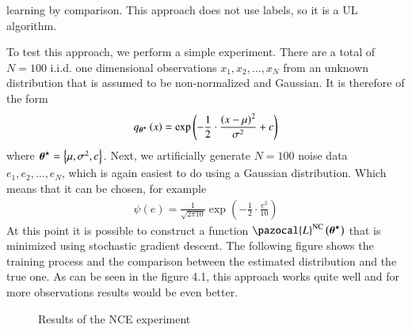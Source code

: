 learning by comparison. This approach does not use labels, so it is a UL algorithm. 
\begin{example}
To test this approach, we perform a simple experiment. There are a total of $N = 100$ i.i.d. one
dimensional observations $x_1,x_2,\dots,x_N$ from an unknown distribution that is assumed to be non-normalized and Gaussian. It is therefore of the form
\begin{align}
    q_{\boldsymbol{\theta}^\star}\left(x\right) = \exp\left(-\frac{1}{2}\cdot\frac{\left(x-\mu\right)^2}{\sigma^2} + c \right)
\end{align}
where $\boldsymbol{\theta}^\star = \left\lbrace \mu, \sigma^2, c \right\rbrace$. Next, we artificially generate $N = 100$ noise data $e_1,e_2,\dots,e_N$, which is again easiest
to do using a Gaussian distribution. Which means that it can be chosen, for example
\begin{align}
    \psi\left(e\right) = \frac{1}{\sqrt{2\pi 10}}\exp\left(-\frac{1}{2}\cdot\frac{e^2}{10} \right)
\end{align}
At this point it is possible to construct a function $\pazocal{L}^{\mathrm{NC}}\left(\bt^\star\right)$ that is minimized using stochastic
gradient descent. The following figure shows the training process and the comparison between
the estimated distribution and the true one. As can be seen in the figure 4.1, this approach works quite well and for more observations results would be even better.
\begin{figure}[h]
	\centering
	\caption{Results of the NCE experiment}%
	\label{ggm}%
\end{figure}
\end{example}

